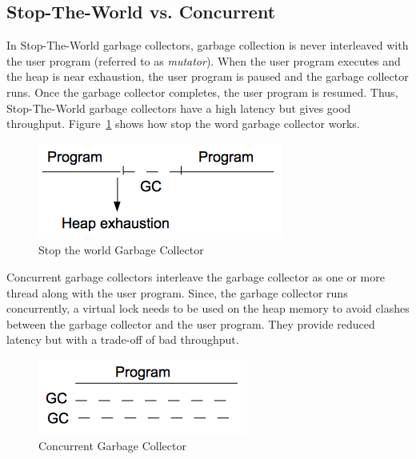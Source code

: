 \documentclass[twoside]{article}
\begin{document}
\subsection{Stop-The-World vs. Concurrent}
In Stop-The-World garbage collectors, garbage collection is never interleaved with the user program (referred to as \textit{mutator}). When the user program executes and the heap is near exhaustion, the user program is paused and the garbage collector runs. Once the garbage collector completes, the user program is resumed. Thus, Stop-The-World garbage collectors have a high latency but gives good throughput. Figure~\ref{fig:stoptheworld} shows how stop the word garbage collector works.\\
\begin{figure}[h]
\centering
\includegraphics[scale=0.5]{stoptheworld.png}
\caption{Stop the world Garbage Collector \label{fig:stoptheworld}}
\end{figure}
Concurrent garbage collectors interleave the garbage collector as one or more thread along with the user program. Since, the garbage collector runs concurrently, a virtual lock needs to be used on the heap memory to avoid clashes between the garbage collector and the user program. They provide reduced latency but with a trade-off of bad throughput.
\begin{figure}[h]
\centering
\includegraphics[scale=0.5]{concurrent.png}
\caption{Concurrent Garbage Collector\label{fig:concurrent}}
\end{figure}
\end{document}
